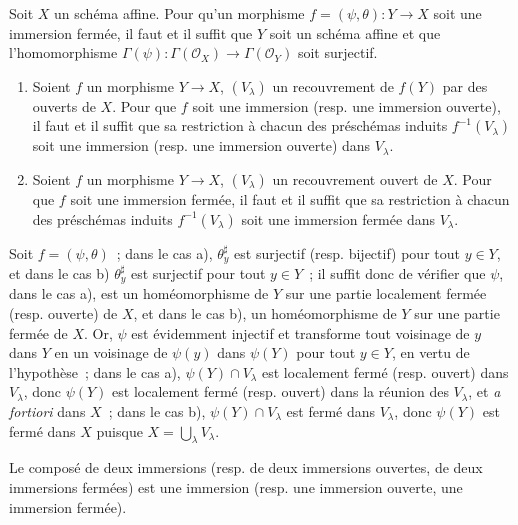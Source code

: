 \begin{corollary}[4.2.3]
\label{I.4.2.3-fr}
Soit $X$ un schéma affine. Pour qu'un morphisme
$f=(\psi,\theta):Y\to X$ soit une immersion fermée, il faut et il suffit que
$Y$ soit un schéma affine et que l'homomorphisme
$\Gamma(\psi):\Gamma(\mathscr{O}_X)\to\Gamma(\mathscr{O}_Y)$ soit surjectif.
\end{corollary}

\begin{corollary}[4.2.4]
\label{I.4.2.4-fr}
\begin{enumerate}
  \item[a)] Soient $f$ un morphisme $Y\to X$, $(V_\lambda)$ un recouvrement
  de $f(Y)$ par des ouverts de $X$. Pour que $f$ soit une immersion (resp. une
  immersion ouverte), il faut et il suffit
  que sa restriction à chacun des préschémas induits $f^{-1}(V_\lambda)$ soit
  une immersion (resp. une immersion ouverte) dans $V_\lambda$.
  \item[b)] Soient $f$ un morphisme $Y\to X$, $(V_\lambda)$ un recouvrement
  ouvert de $X$. Pour que $f$ soit une immersion fermée, il faut et il suffit
  que sa restriction à chacun des préschémas induits $f^{-1}(V_\lambda)$ soit
  une immersion fermée dans $V_\lambda$.
\end{enumerate}
\end{corollary}

Soit $f=(\psi,\theta)$~; dans le cas a), $\theta_y^\sharp$ est surjectif
(resp. bijectif) pour tout $y\in Y$, et dans le cas b) $\theta_y^\sharp$ est
surjectif pour tout $y\in Y$~; il suffit donc de vérifier que $\psi$, dans le
cas a), est un homéomorphisme de $Y$ sur une partie localement fermée (resp.
ouverte) de $X$, et dans le cas b), un homéomorphisme de $Y$ sur une partie
fermée de $X$. Or, $\psi$ est évidemment injectif et transforme tout voisinage
de $y$ dans $Y$ en un voisinage de $\psi(y)$ dans $\psi(Y)$ pour tout $y\in Y$,
en vertu de l'hypothèse~; dans le cas a), $\psi(Y)\cap V_\lambda$ est localement
fermé (resp. ouvert) dans $V_\lambda$, donc $\psi(Y)$ est localement fermé
(resp. ouvert) dans la réunion des $V_\lambda$, et \emph{a fortiori} dans $X$~;
dans le cas b), $\psi(Y)\cap V_\lambda$ est fermé dans $V_\lambda$, donc
$\psi(Y)$ est fermé dans $X$ puisque $X=\bigcup_\lambda V_\lambda$.

\begin{proposition}[4.2.5]
\label{I.4.2.5-fr}
Le composé de deux immersions (resp. de deux immersions ouvertes, de deux
immersions fermées) est une immersion (resp. une immersion ouverte, une
immersion fermée).
\end{proposition}

